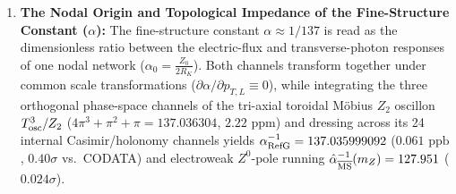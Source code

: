 \documentclass[11pt,a4paper]{article}
\begin{document}
\begin{enumerate}[label=\arabic*.]
\item \textbf{The Nodal Origin and Topological Impedance of the Fine-Structure Constant ($\alpha$):} The fine-structure constant $\alpha \approx 1/137$ is read as the dimensionless ratio between the electric-flux and transverse-photon responses of one nodal network ($\alpha_0 = \frac{Z_0}{2 R_K}$). Both channels transform together under common scale transformations ($\partial\alpha/\partial p_{T,L} \equiv 0$), while integrating the three orthogonal phase-space channels of the tri-axial toroidal Möbius $Z_2$ oscillon $T^3_{\rm osc}/Z_2$ ($4\pi^3 + \pi^2 + \pi = 137.036304$, $2.22\text{ ppm}$) and dressing across its 24 internal Casimir/holonomy channels yields $\alpha_{\rm RefG}^{-1} = 137.035999092$ ($0.061\text{ ppb}$, $0.40\sigma$ vs.\ CODATA) and electroweak $Z^0$-pole running $\hat{\alpha}_{\overline{\rm MS}}^{-1}(m_Z) = 127.951$ ($0.024\sigma$).

\end{enumerate}
\end{document}
